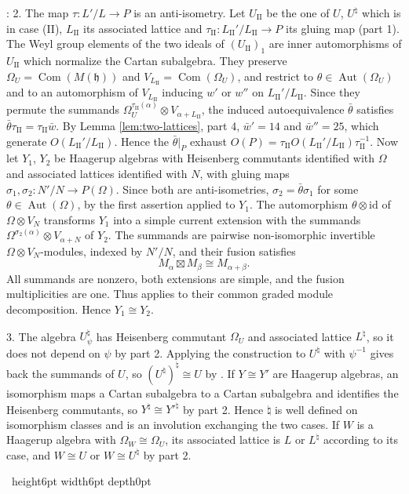 \documentclass[leqno]{article}
\newcommand{\qed}{\hfill \vrule height6pt  width6pt depth0pt}
\newcommand{\co}{\colon}
\newcommand{\ot}{\otimes}
\newenvironment{proof}[1][]{\noindent {\it Proof #1} : }{\hbox{~}\qed
\smallskip
}
\numberwithin{equation}{section}
\begin{document}
\begin{proof}
2. The map $\tau \co L'/L \to P$ is an anti-isometry. Let $U_{\mathrm{II}}$ be the one of $U$, $U^\natural$ which is in case (II), $L_{\mathrm{II}}$ its associated lattice and $\tau_{\mathrm{II}} \co L_{\mathrm{II}}'/L_{\mathrm{II}} \to P$ its gluing map (part 1). The Weyl group elements of the two ideals of $(U_{\mathrm{II}})_1$ are inner automorphisms of $U_{\mathrm{II}}$ which normalize the Cartan subalgebra. They preserve $\Omega_U = \operatorname{Com}(M(\mathfrak h))$ and $V_{L_{\mathrm{II}}} = \operatorname{Com}(\Omega_U)$, and restrict to $\theta \in \operatorname{Aut}(\Omega_U)$ and to an automorphism of $V_{L_{\mathrm{II}}}$ inducing $w'$ or $w''$ on $L_{\mathrm{II}}'/L_{\mathrm{II}}$. Since they permute the summands $\Omega_U^{\tau_{\mathrm{II}}(\alpha)} \ot V_{\alpha+L_{\mathrm{II}}}$, the induced autoequivalence $\bar\theta$ satisfies $\bar\theta\tau_{\mathrm{II}} = \tau_{\mathrm{II}}\bar w$. By Lemma \ref{lem:two-lattices}, part 4, $\bar w' = 14$ and $\bar w'' = 25$, which generate $O(L_{\mathrm{II}}'/L_{\mathrm{II}})$. Hence the $\bar\theta|_P$ exhaust $O(P) = \tau_{\mathrm{II}}O(L_{\mathrm{II}}'/L_{\mathrm{II}})\tau_{\mathrm{II}}^{-1}$. Now let $Y_1$, $Y_2$ be Haagerup algebras with Heisenberg commutants identified with $\Omega$ and associated lattices identified with $N$, with gluing maps $\sigma_1,\sigma_2 \co N'/N \to P(\Omega)$. Since both are anti-isometries, $\sigma_2 = \bar\theta\sigma_1$ for some $\theta \in \operatorname{Aut}(\Omega)$, by the first assertion applied to $Y_1$. The automorphism $\theta \ot \mathrm{id}$ of $\Omega \ot V_N$ transforms $Y_1$ into a simple current extension with the summands $\Omega^{\sigma_2(\alpha)} \ot V_{\alpha+N}$ of $Y_2$. The summands are pairwise non-isomorphic invertible $\Omega \ot V_N$-modules, indexed by $N'/N$, and their fusion satisfies
\[
M_\alpha \boxtimes M_\beta \cong M_{\alpha+\beta}.
\]
All summands are nonzero, both extensions are simple, and the fusion multiplicities are one. Thus \cite[Proposition 5.3]{DoM04} applies to their common graded module decomposition. Hence $Y_1 \cong Y_2$.

3. The algebra $U^\natural_\psi$ has Heisenberg commutant $\Omega_U$ and associated lattice $L^\natural$, so it does not depend on $\psi$ by part 2. Applying the construction to $U^\natural$ with $\psi^{-1}$ gives back the summands of $U$, so $(U^\natural)^\natural \cong U$ by \cite[Proposition 5.3]{DoM04}. If $Y \cong Y'$ are Haagerup algebras, an isomorphism maps a Cartan subalgebra to a Cartan subalgebra and identifies the Heisenberg commutants, so $Y^\natural \cong Y'^\natural$ by part 2. Hence $\natural$ is well defined on isomorphism classes and is an involution exchanging the two cases. If $W$ is a Haagerup algebra with $\Omega_W \cong \Omega_U$, its associated lattice is $L$ or $L^\natural$ according to its case, and $W \cong U$ or $W \cong U^\natural$ by part 2.


\end{proof}
\end{document}
